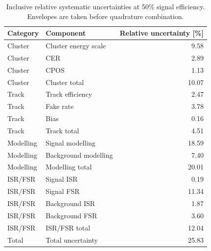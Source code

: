 \begin{table}[tbp]
\centering
\caption{Inclusive relative systematic uncertainties at 50\% signal efficiency. Envelopes are taken before quadrature combination.}
\label{tab:inclusive-systematics-wp50}
\begin{tabular}{llr}
\toprule
Category & Component & Relative uncertainty [\%] \\
\midrule
Cluster & Cluster energy scale & 9.58 \\
Cluster & CER & 2.89 \\
Cluster & CPOS & 1.13 \\
Cluster & Cluster total & 10.07 \\
Track & Track efficiency & 2.47 \\
Track & Fake rate & 3.78 \\
Track & Bias & 0.16 \\
Track & Track total & 4.51 \\
Modelling & Signal modelling & 18.59 \\
Modelling & Background modelling & 7.40 \\
Modelling & Modelling total & 20.01 \\
ISR/FSR & Signal ISR & 0.19 \\
ISR/FSR & Signal FSR & 11.34 \\
ISR/FSR & Background ISR & 1.87 \\
ISR/FSR & Background FSR & 3.60 \\
ISR/FSR & ISR/FSR total & 12.04 \\
Total & Total uncertainty & 25.83 \\
\bottomrule
\end{tabular}
\end{table}
